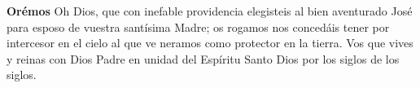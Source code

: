 \vspace{0.5em}

\textbf{Orémos}
Oh Dios, que con inefable pro­videncia elegisteis al bien­ aventurado José para esposo de vuestra santísima Madre; os ro­gamos nos concedáis tener por intercesor en el cielo al que ve­
neramos como protector en la tierra. Vos que vives y reinas con Dios Padre en unidad del Espíritu Santo Dios por los siglos de los siglos. 

\vspace{0.5em}

\begin{otherlanguage}{latin}
      

      \vspace{0.25em}

      

      \vspace{0.25em}

      

      \vspace{0.25em}

\end{otherlanguage}